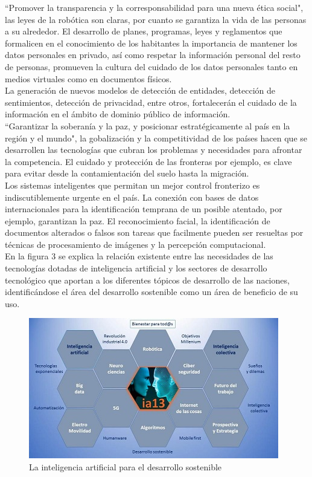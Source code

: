 \documentclass[preprint,12pt,3p]{elsarticle}
\begin{document}
``Promover la transparencia y la corresponsabilidad para una nueva ética social", las leyes de la robótica son claras, por cuanto se garantiza la vida de las personas a su alrededor. El desarrollo de planes, programas, leyes y reglamentos que formalicen en el conocimiento de los habitantes la importancia de mantener los datos personales en privado, así como respetar la información personal del resto de personas, promueven la cultura del cuidado de los datos personales tanto en medios virtuales como en documentos físicos.\\

La generación de nuevos modelos de detección de entidades, detección de sentimientos, detección de privacidad, entre otros, fortalecerán el cuidado de la información en el ámbito de dominio público de información.\\


``Garantizar la soberanía y la paz, y posicionar estratégicamente al país en la región y el mundo", la gobalización y la competitividad de los países hacen que se desarrollen las tecnologías que cubran los problemas y necesidades para afrontar la competencia.  El cuidado y protección de las fronteras por ejemplo, es clave para evitar desde la contamientación del suelo hasta la migración.\\

Los sistemas inteligentes que permitan un mejor control fronterizo es indiscutiblemente urgente en el país. La conexión con bases de datos internacionales para la identificación temprana de un posible atentado, por ejemplo, garantizan la paz. El reconocimiento facial, la identificación de documentos alterados o falsos son tareas que facilmente pueden ser resueltas por técnicas de procesamiento de imágenes y la percepción computacional.\\

En la figura 3 se explica la relación existente entre las necesidades de las tecnologías dotadas de inteligencia artificial y los sectores de desarrollo tecnológico que aportan a los diferentes tópicos de desarrollo de las naciones, identificándose el área del desarrollo sostenible como un área de beneficio de su uso.

\begin{figure}
    \centering
    \includegraphics{lamina_panal_tematico_ia13.jpg}
    \caption{\label{Figura 3}{La inteligencia artificial para el desarrollo sostenible}}
\end{figure}
\end{document}
